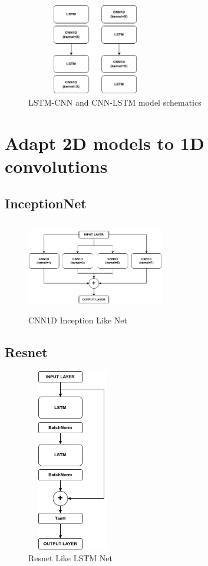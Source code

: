 \documentclass[11pt]{article}
\begin{document}
\begin{figure}[h]
\centering
\includegraphics[width=6cm, height=4cm]{LSTMCNN}
\caption{LSTM-CNN and CNN-LSTM model schematics}
\end{figure}

\section{Adapt 2D models to 1D convolutions}
\subsection{InceptionNet}
\begin{figure}[h]
\centering
\includegraphics[width=6cm, height=4cm]{Inception}
\caption{CNN1D Inception Like Net}
\end{figure}

\subsection{Resnet}
\begin{figure}[h]
\centering
\includegraphics[width=4cm, height=8cm,angle =90]{resnet}
\caption{Resnet Like LSTM Net}
\end{figure}




\end{document}
